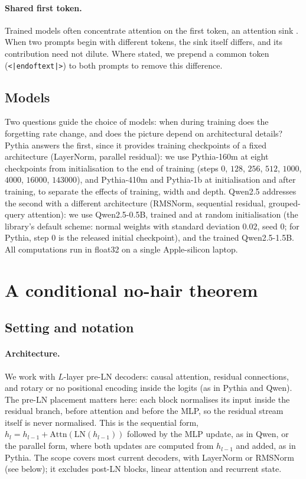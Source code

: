 \documentclass[11pt]{article}
\theoremstyle{definition}
\theoremstyle{remark}
\begin{document}
\paragraph{Shared first token.} Trained models often concentrate attention on the first token, an attention sink \citep{xiao2024streaming}. When two prompts begin with different tokens, the sink itself differs, and its contribution need not dilute. Where stated, we prepend a common token (\texttt{<|endoftext|>}) to both prompts to remove this difference.

\subsection{Models}\label{sec:measure-models}

Two questions guide the choice of models: when during training does the forgetting rate change, and does the picture depend on architectural details? Pythia \citep{biderman2023pythia} answers the first, since it provides training checkpoints of a fixed architecture (LayerNorm, parallel residual): we use Pythia-160m at eight checkpoints from initialisation to the end of training (steps $0$, $128$, $256$, $512$, $1000$, $4000$, $16000$, $143000$), and Pythia-410m and Pythia-1b at initialisation and after training, to separate the effects of training, width and depth. Qwen2.5 \citep{qwen2025} addresses the second with a different architecture (RMSNorm, sequential residual, grouped-query attention): we use Qwen2.5-0.5B, trained and at random initialisation (the library's default scheme: normal weights with standard deviation $0.02$, seed $0$; for Pythia, step $0$ is the released initial checkpoint), and the trained Qwen2.5-1.5B. All computations run in float32 on a single Apple-silicon laptop.

\section{A conditional no-hair theorem}
\label{sec:theory}

\subsection{Setting and notation}
\label{sec:theory-setting}

\paragraph{Architecture.} We work with $L$-layer pre-LN decoders: causal attention, residual connections, and rotary or no positional encoding inside the logits (as in Pythia and Qwen). The pre-LN placement matters here: each block normalises its input inside the residual branch, before attention and before the MLP, so the residual stream itself is never normalised. This is the sequential form, $h_l=h_{l-1}+\mathrm{Attn}(\mathrm{LN}(h_{l-1}))$ followed by the MLP update, as in Qwen, or the parallel form, where both updates are computed from $h_{l-1}$ and added, as in Pythia. The scope covers most current decoders, with LayerNorm or RMSNorm (see below); it excludes post-LN blocks, linear attention and recurrent state.
\end{document}
